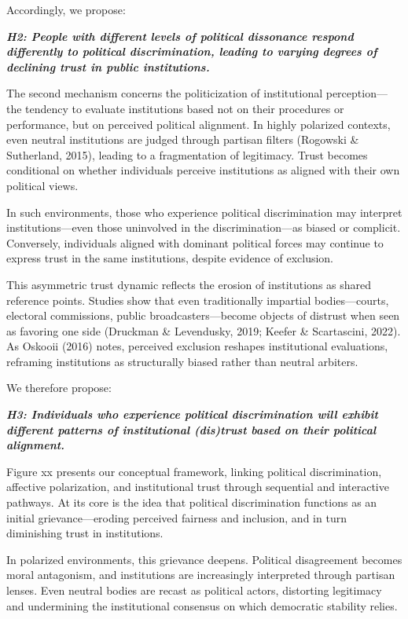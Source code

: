 \documentclass{article}
\begin{document}
Accordingly, we propose:

\emph{\textbf{\small
H2: People with different levels of political dissonance respond differently to political discrimination, leading to varying degrees of declining trust in public institutions.
}}

The second mechanism concerns the politicization of institutional perception—the tendency to evaluate institutions based not on their procedures or performance, but on perceived political alignment. In highly polarized contexts, even neutral institutions are judged through partisan filters (Rogowski \& Sutherland, 2015), leading to a fragmentation of legitimacy. Trust becomes conditional on whether individuals perceive institutions as aligned with their own political views.

In such environments, those who experience political discrimination may interpret institutions—even those uninvolved in the discrimination—as biased or complicit. Conversely, individuals aligned with dominant political forces may continue to express trust in the same institutions, despite evidence of exclusion.

This asymmetric trust dynamic reflects the erosion of institutions as shared reference points. Studies show that even traditionally impartial bodies—courts, electoral commissions, public broadcasters—become objects of distrust when seen as favoring one side (Druckman \& Levendusky, 2019; Keefer \& Scartascini, 2022). As Oskooii (2016) notes, perceived exclusion reshapes institutional evaluations, reframing institutions as structurally biased rather than neutral arbiters.

We therefore propose:

\emph{\textbf{\small
H3: Individuals who experience political discrimination will exhibit different patterns of institutional (dis)trust based on their political alignment.
}}

Figure xx presents our conceptual framework, linking political discrimination, affective polarization, and institutional trust through sequential and interactive pathways. At its core is the idea that political discrimination functions as an initial grievance—eroding perceived fairness and inclusion, and in turn diminishing trust in institutions.

In polarized environments, this grievance deepens. Political disagreement becomes moral antagonism, and institutions are increasingly interpreted through partisan lenses. Even neutral bodies are recast as political actors, distorting legitimacy and undermining the institutional consensus on which democratic stability relies.
\end{document}
